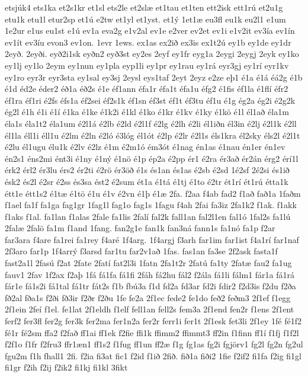 {etsjúk4
ets1ka
et2s1kr
et1sl
ets2le
et2slæ
et1tau
et1ten
ett2isk
ett1rú
et2u1g
etu1k
etu1l
etur2sp
et1ú
e2tw
et1yl
et1yst.
et1ý
1et1æ
eu3fl
eu1k
eu2l1
e1um
1e2ur
e1us
eu1st
e1ú
ev1a
eva2g
e1v2al
ev1e
e2ver
ev2et
ev1i
e1v2it
ev3ía
ev1ín
ev1ít
ev3íu
evon3
ev1on.
1evr
1ews.
ex1as
ex2ið
ex3is
ex1t2ú
ey1b
ey1de
ey1dr
2eyð.
2eyði.
eyð2i1sk
eyðn2
eyð3st
ey2es
2eyf
ey1fr
eyg1a
2eygi
2eygj
2eyk
ey1ko
ey1lj
ey1lo
2eym
ey1nun
ey1pla
eyp1li
ey1pr
ey1rau
ey1rá
eyr3gj
ey1rí
eyr1kv
ey1ro
eyr3r
eyr3sta
ey1sal
ey3sj
2eysl
eys1taf
2eyt
2eyz
e2ze
eþ1
é1a
é1á
éá2g
é1b
é1d
éd2e
éder2
éð1a
éð2s
é1e
éf1ann
éfa1r
éfa1t
éfa1u
éfg2
é1fis
éf1la
é1flí
éfr2
éf1ra
éf1ri
é2fs
éfs1a
éf2sei
éf2s1k
éf1sn
éf3st
éf1t
éf3tu
éf1u
é1g
ég2a
ég2i
é2g2k
ég2l
é1h
é1i
é1í
é1ka
é1ke
é1k2i
é1kl
é1ko
é1kr
é1kv
é1ky
é1kö
é1l
él1að
éla1m
éla1s
éla1t2
éla1um
é2l1á
é2lb
é2ld
é2l1f
é2lg
é2lh
é2li
él1iðn
él3in
é2lj
é2l1k
é2ll
él1la
éll1i
éll1u
é2lm
é2ln
é2ló
é3lóg
él1ót
é2lp
é2lr
é2l1s
éls1kra
él2sky
éls2l
é2l1t
é2lu
él1ugu
élu1k
é2lv
é2lz
é1m
é2m1ó
ém3ót
é1nag
én1as
é1nau
én1er
én1ev
én2s1
éns2mi
ént3i
é1ny
é1ný
é1nö
é1p
ép2a
é2pp
ér1
é2ra
ér3að
ér2án
érg2
érí1l
érk2
érl2
ér3lu
érs2
ér2ti
é2rö
ér3öð
é1s
és1an
és1as
é2sb
é2sd
1é2sf
2é2si
és1ið
ésk2
és2l
é2sr
é2ss
és3sa
ést2
é2sum
ét1a
é1tá
é1tj
é1to
é2tr
ét1rí
ét1rú
étta1k
étt1e
étt1s2
é1tæ
é1tö
é1u
é1v
é2vn
é1þ
é1æ
2fa.
f2aa
f4ab
fad2
f1að
fað1a
1faðm
f1ael
fa1f
fa1ga
fag1gr
1fag1l
fag1o
fag1s
1fagu
f4ah
2fai
fa3iz
2fa1k2
f1ak.
f1akk
f1aks
f1al.
fa1lan
f1alas
2fale
fa1lis
2falí
fal2k
fall1an
fal2l1en
fal1ó
1fal2s
fa1lú
2falæ
2falö
fa1m
f1and
1fang.
fan2g1e
fan1k
fan3ná
fann1s
fa1nó
fa1p
f2ar
far3ara
f4are
fa1rei
fa1rey
f4aré
1f4arg.
1f4argj
f3arh
far1im
far1ist
f4a1rí
far1naf
2f3aro
far1p
1f4arrý
f3arsd
far1tu
far2v1að
1fas.
fas1an
fa3se
2f2ask
fasta1f
fast2a1l
2fasú
f2at
2fate
2fatí
fat2l3i
1fatn
2fa1t2r
2fatú
fa1ty
2fatæ
fau2
fa1ug
fauv1
2fav
1f2ax
f2aþ
1fá
fá1fa
fá1fi
2fáh
fá2hu
fál2
f2ála
fá1li
fálm1
fár1a
fá1rá
fár1e
fá1s2i
fá1tal
fá1tr
fát2s
f1b
fbú3a
f1d
fd2a
fd3ar
fd2i
fdir2
f2d3is
f2du
f2ða
fð2al
fða1s
f2ði
fð3ir
f2ðr
f2ðu
1fe
fe2a
2f1ec
fede2
fe1do
feð2
feðm3
2f1ef
f1egg
2f1ein
2feí
f1el.
fe1lat
2f1eldh
f1elf
fell1an
fell2s
fem3a
2f1end
fen2r
f1ens
2f1ent
ferf2
fer3fl
fer2g
fer3k
fer2ma
fer1n2a
fer2r
ferr1i
fer1t
2f1esk
fet3li
2f1ey
1fé
fé1f2
fé1r
fé2sm
ffa2
f2fað
ff1ai
ff1ek
f2fie
ffi1k
ffimm2
ffimmt3
ff2in
f1finn
ff1í
f1fj
f1f2l
f2f1o
f1fr
f2fru3
ffr1æn1
ff1s2
f1fug
ff1un
ff2æ
f1g
fg1as
fg2i
fgjörv1
fg2l
fg2n
fg2ul
fgu2m
f1h
fhall1
2fi.
f2ia
fi3at
fic1
f2id
f1ið
2fið.
fið1a
fiði2
1fie
f2if2
fi1fa
f2ig
fi1gl
fi1gr
f2ih
f2ij
f2ik2
fi1kj
fi1kl
3fikt
}
